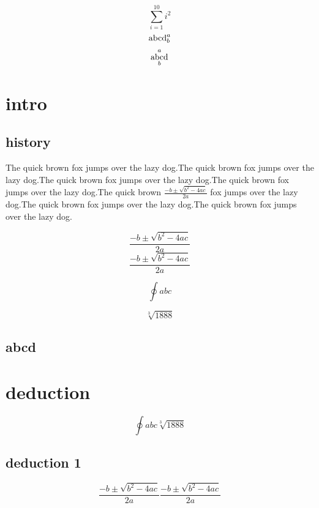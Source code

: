 \documentclass{book}    %
\newcommand{\fc}{\frac}  %
\begin{document}
	
$$\sum_{i=1}^{10}i^2$$  %
$${\rm abcd}^a_b$$
$$\mathop{{\rm abcd}}^a_b$$

\chapter{intro}
\section{history}
The quick brown fox jumps over the lazy dog.The quick brown fox jumps over the lazy dog.The quick brown fox jumps over the lazy dog.The quick brown fox jumps over the lazy dog.The quick brown
$\frac{{- b \pm \sqrt {{b^2} - 4ac} }}{2a}$ fox jumps over the lazy dog.The quick brown fox jumps over the lazy dog.The quick brown fox jumps over the lazy dog.


$$\frac{{- b \pm \sqrt {{b^2} - 4ac} }}{2a}$$       %
\[\fc{{- b \pm \sqrt {{b^2}  -4ac} }}{2a}\]



\begin{equation}
\oint{abc}
\end{equation}

\begin{equation}
\sqrt[3]{1888}
\end{equation}


\section{abcd}

\chapter{deduction}

\begin{subequations}  %
	\begin{equation}
	\oint{abc}
	\end{equation}
	
	\begin{equation}
	\sqrt[3]{1888}
	\end{equation}
\end{subequations}

\section{deduction 1}
\begin{subequations}  %
	\begin{equation}\boxed{ 
	\frac{{- b \pm \sqrt {{b^2} - 4ac} }}{2a}}
	\end{equation}
	
	\begin{equation}
	\frac{{- b \pm \sqrt {{b^2} - 4ac} }}{2a}
	\end{equation}
\end{subequations}
\end{document}
